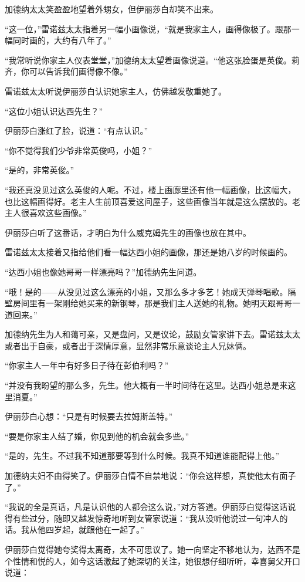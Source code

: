 \par 加德纳太太笑盈盈地望着外甥女，但伊丽莎白却笑不出来。
\par “这一位，”雷诺兹太太指着另一幅小画像说，“就是我家主人，画得像极了。跟那一幅同时画的，大约有八年了。”
\par “我常听说你家主人仪表堂堂，”加德纳太太望着画像说道。“他这张脸蛋是英俊。莉齐，你可以告诉我们画得像不像。”
\par 雷诺兹太太听说伊丽莎白认识她家主人，仿佛越发敬重她了。
\par “这位小姐认识达西先生？”
\par 伊丽莎白涨红了脸，说道：“有点认识。”
\par “你不觉得我们少爷非常英俊吗，小姐？”
\par “是的，非常英俊。”
\par “我还真没见过这么英俊的人呢。不过，楼上画廊里还有他一幅画像，比这幅大，也比这幅画得好。老主人生前顶喜爱这间屋子，这些画像当年就是这么摆放的。老主人很喜欢这些画像。”
\par 伊丽莎白听了这番话，才明白为什么威克姆先生的画像也放在其中。
\par 雷诺兹太太接着又指给他们看一幅达西小姐的画像，那还是她八岁的时候画的。
\par “达西小姐也像她哥哥一样漂亮吗？”加德纳先生问道。
\par “哦！是的——从没见过这么漂亮的小姐，又那么多才多艺！她成天弹琴唱歌。隔壁房间里有一架刚给她买来的新钢琴，那是我们主人送她的礼物。她明天跟哥哥一道回来。”
\par 加德纳先生为人和蔼可亲，又是盘问，又是议论，鼓励女管家讲下去。雷诺兹太太或者出于自豪，或者出于深情厚意，显然非常乐意谈论主人兄妹俩。
\par “你家主人一年中有好多日子待在彭伯利吗？”
\par “并没有我盼望的那么多，先生。他大概有一半时间待在这里。达西小姐总是来这里消夏。”
\par 伊丽莎白心想：“只是有时候要去拉姆斯盖特。”
\par “要是你家主人结了婚，你见到他的机会就会多些。”
\par “是的，先生。不过我不知道那要等到什么时候。我真不知道谁能配得上他。”
\par 加德纳夫妇不由得笑了。伊丽莎白情不自禁地说：“你会这样想，真使他太有面子了。”
\par “我说的全是真话，凡是认识他的人都会这么说，”对方答道。伊丽莎白觉得这话说得有些过分，随即又越发惊奇地听到女管家说道：“我从没听他说过一句冲人的话。我从他四岁起，就跟他在一起了。”
\par 伊丽莎白觉得她夸奖得太离奇，太不可思议了。她一向坚定不移地认为，达西不是个性情和悦的人，如今这话激起了她深切的关注，她很想仔细听听，幸喜舅父开口说道：

